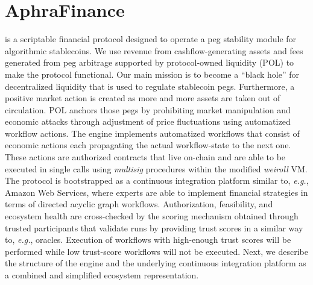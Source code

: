 \section{AphraFinance}
\label{sec:aphrafinance}
\aphra is a scriptable financial protocol designed to operate a peg stability module for algorithmic stablecoins.
We use revenue from cashflow-generating assets and fees generated from peg arbitrage supported by protocol-owned liquidity (POL) to make the protocol functional.\cite{aphra-finance}
Our main mission is to become a ``black hole'' for decentralized liquidity that is used to regulate stablecoin pegs.
Furthermore, a positive market action is created as more and more assets are taken out of circulation. 
POL anchors those pegs by prohibiting market manipulation and economic attacks through adjustment of price fluctuations using automatized workflow actions.
The \aphra engine implements automatized workflows that consist of economic actions each propagating the actual workflow-state to the next one.
These actions are authorized contracts that live on-chain and are able to be executed in single calls using \textit{multisig} procedures within the modified \textit{weiroll} VM.\cite{weirollvm}
The protocol is bootstrapped as a continuous integration platform similar to, \textit{e.g.}, Amazon Web Services, where experts are able to implement financial strategies in terms of directed acyclic graph\cite{thulasiraman2011} workflows.
Authorization, feasibility, and ecosystem health are cross-checked by the \aphra scoring mechanism obtained through trusted participants that validate runs by providing trust scores in a similar way to, \textit{e.g.}, oracles.
Execution of workflows with high-enough trust scores will be performed while low trust-score workflows will not be executed.
Next, we describe the structure of the \aphra engine and the underlying continuous integration platform as a combined and simplified ecosystem representation.

